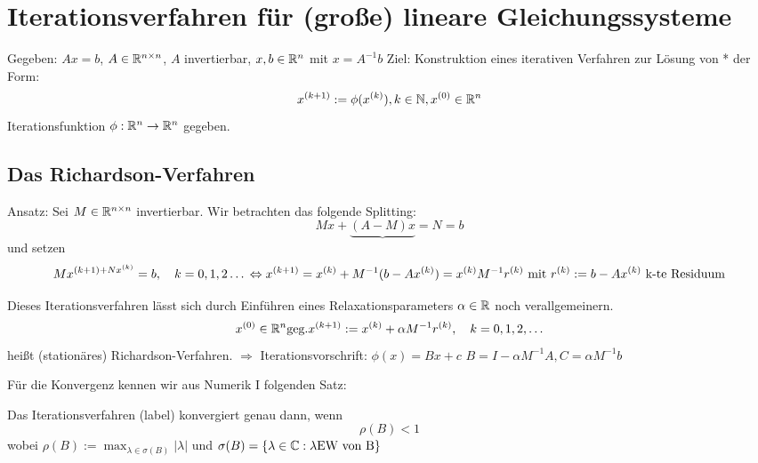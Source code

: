 \chapter{Iterationsverfahren für (große) lineare Gleichungssysteme}
Gegeben: $Ax=b$, $A\in \mathbb{R}^{n\times n}$, $A$ invertierbar, $x,b \in \mathbb{R}^n$ mit $x=A^{-1}b$
Ziel: Konstruktion eines iterativen Verfahren zur Lösung von * der Form:
\begin{equation}
  x^{(k+1)} := \phi(x^{(k)}), k\in \mathbb{N}, x^{(0)} \in \mathbb{R}^n
  \label{}
\end{equation}
Iterationsfunktion $\phi: \mathbb{R}^n \to \mathbb{R}^n$ gegeben.

\section{Das Richardson-Verfahren}
Ansatz: Sei $M\in \mathbb{R}^{n\times n}$ invertierbar. Wir betrachten das folgende Splitting:
\begin{equation}
  Mx + \underbrace{(A-M)x}{=N} = b
  \label{}
\end{equation}
und setzen 
\begin{equation}
  Mx^{(k+1) + Nx^{(k)}} = b,\quad k=0,1,2\dots\\
  \Leftrightarrow x^{(k+1)} = x^{(k)} + M^{-1}(b-Ax^{(k)})
  = x^{(k)} M^{-1}r^{(k)} \text{ mit } r^{(k)} := b-Ax^{(k)} \text{ k-te Residuum} %
  \label{}
\end{equation}

Dieses Iterationsverfahren lässt sich durch Einführen eines Relaxationsparameters $\alpha \in \mathbb{R}$ noch verallgemeinern.
\begin{equation}
  x^{(0)} \in \R^n \text{geg.}
  x^{(k+1)} := x^{(k)} + \alpha M^{-1} r^{(k)},\quad k=0,1,2,\dots
  \label{Iterationsverfahren}
\end{equation}
heißt (stationäres) Richardson-Verfahren. 
$\Rightarrow$ Iterationsvorschrift: $\phi(x) = Bx + c$ $B=I-\alpha M^{-1}A, C=\alpha M^{-1}b$

Für die Konvergenz kennen wir aus Numerik I folgenden Satz:

\begin{satz}
  \label{itkonvergenz}
  Das Iterationsverfahren (label) konvergiert genau dann, wenn 
  \begin{equation}
    \rho (B) < 1 
    \label{}
  \end{equation}
  wobei $\rho(B) := \max_{\lambda \in \sigma(B)} |\lambda|$ und $\sigma(B) = \left\{ \lambda\in \mathbb{C}: \lambda \text{EW von B} \right\}$
\end{satz}

